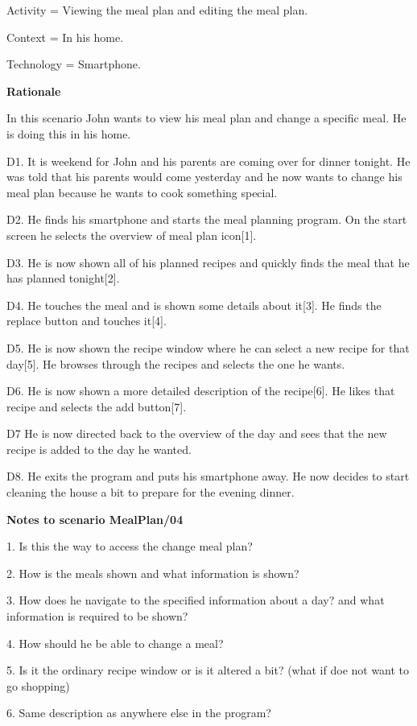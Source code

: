 	Activity = Viewing the meal plan and editing the meal plan.
	
	Context = In his home. 
	
	Technology = Smartphone.
	
\textbf{Rationale}

In this scenario John wants to view his meal plan and change a specific meal. He is doing this in his home.

	D1. It is weekend for John and his parents are coming over for dinner tonight. He was told that his parents would come yesterday and he now wants to change his meal plan because he wants to cook something special.
	
	D2. He finds his smartphone and starts the meal planning program. On the start screen he selects the overview of meal plan icon[1].
	
	D3. He is now shown all of his planned recipes and quickly finds the meal that he has planned tonight[2].
	
	D4. He touches the meal and is shown some details about it[3]. He finds the replace button and touches it[4].
	
	D5. He is now shown the recipe window where he can select a new recipe for that day[5]. He browses through the recipes and selects the one he wants. 

	D6. He is now shown a more detailed description of the recipe[6]. He likes that recipe and selects the add button[7].

	D7 He is now directed back to the overview of the day and sees that the new recipe is added to the day he wanted.
	
	D8. He exits the program and puts his smartphone away. He now decides to start cleaning the house a bit to prepare for the evening dinner.
	
\textbf{Notes to scenario MealPlan/04}

1. Is this the way to access the change meal plan?

2. How is the meals shown and what information is shown? 

3. How does he navigate to the specified information about a day? and what information is required to be shown?

4. How should he be able to change a meal?

5. Is it the ordinary recipe window or is it altered a bit? (what if doe not want to go shopping) 

6. Same description as anywhere else in the program?

